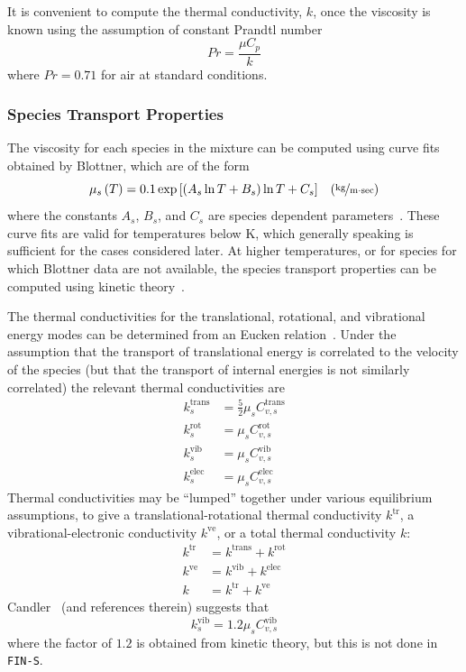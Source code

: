 It is convenient to compute the thermal conductivity, $k$, once the viscosity is known using the assumption of constant Prandtl number
\begin{equation}
Pr = \frac{\mu C_p}{k}
\end{equation}
where $Pr=0.71$ for air at standard conditions.

\subsubsection{Species Transport Properties}
The viscosity for each species in the mixture can be computed using curve fits obtained by Blottner, which are of the form
\begin{equation}
  \mu_s\left(T\right) = 0.1 \exp\left[\left(A_s \ln T + B_s\right) \ln T + C_s\right] \;\;\; \left(\unitfrac{kg}{m\cdot sec}\right)
\end{equation}
where the constants $A_s$, $B_s$, and $C_s$ are species dependent parameters~\cite{blottner_viscous,wright_thesis}. These curve fits are valid for temperatures below \unit[10,000]{K}, which generally speaking is sufficient for the cases considered later. At higher temperatures, or for species for which Blottner data are not available, the species transport properties can be computed using kinetic theory~\cite{vincenti_kruger}.

The thermal conductivities for the translational, rotational, and vibrational energy modes can be determined from an Eucken relation~\cite{vincenti_kruger}. Under the assumption that the transport of translational energy is correlated to the velocity of the species (but that the transport of internal energies is not similarly correlated) the relevant thermal conductivities are
\begin{align}
  k^{\text{trans}}_s &= \frac{5}{2} \mu_s C^{\text{trans}}_{v,s} \\
  k^{\text{rot}}_s   &= \mu_s C^{\text{rot}}_{v,s} \\
  k^{\text{vib}}_s   &= \mu_s C^{\text{vib}}_{v,s} \\
  k^{\text{elec}}_s   &= \mu_s C^{\text{elec}}_{v,s}
\end{align}
%
Thermal conductivities may be ``lumped'' together under various
equilibrium assumptions, to give a translational-rotational thermal
conductivity $k^{\text{tr}}$, a vibrational-electronic conductivity
$k^{\text{ve}}$,
or a total thermal conductivity $k$:
\begin{align}
  \label{eq:thermal_subconductivity_start}
  k^{\text{tr}} &= k^{\text{trans}} + k^{\text{rot}} \\
  k^{\text{ve}} &= k^{\text{vib}} + k^{\text{elec}} \\
  k &= k^{\text{tr}} + k^{\text{ve}}
  \label{eq:thermal_subconductivity_end}
\end{align}
%
Candler~\cite{Candler2010} (and references therein) suggests that 
%
\begin{equation}
k^{\text{vib}}_s   = 1.2 \mu_s C^{\text{vib}}_{v,s}
\end{equation}
%
where the factor of $1.2$ is obtained from kinetic theory, but this is
not done in \texttt{FIN-S}.

